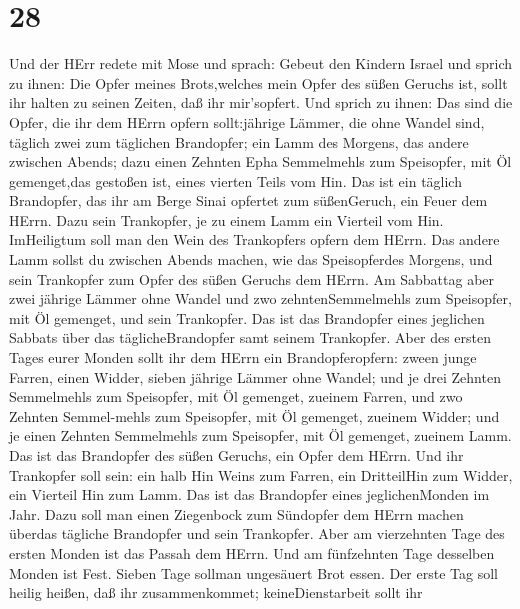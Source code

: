 \hypertarget{section-27}{%
\section{28}\label{section-27}}

 Und der HErr redete mit Mose und sprach: 
Gebeut den Kindern Israel und sprich zu ihnen: Die Opfer meines
Brots,welches mein Opfer des süßen Geruchs ist, sollt ihr halten zu
seinen Zeiten, daß ihr mir'sopfert.  Und sprich zu ihnen:
Das sind die Opfer, die ihr dem HErrn opfern sollt:jährige Lämmer, die
ohne Wandel sind, täglich zwei zum täglichen Brandopfer; 
ein Lamm des Morgens, das andere zwischen Abends;  dazu
einen Zehnten Epha Semmelmehls zum Speisopfer, mit Öl gemenget,das
gestoßen ist, eines vierten Teils vom Hin.  Das ist ein
täglich Brandopfer, das ihr am Berge Sinai opfertet zum süßenGeruch, ein
Feuer dem HErrn.  Dazu sein Trankopfer, je zu einem Lamm ein
Vierteil vom Hin. ImHeiligtum soll man den Wein des Trankopfers opfern
dem HErrn.  Das andere Lamm sollst du zwischen Abends
machen, wie das Speisopferdes Morgens, und sein Trankopfer zum Opfer des
süßen Geruchs dem HErrn.  Am Sabbattag aber zwei jährige
Lämmer ohne Wandel und zwo zehntenSemmelmehls zum Speisopfer, mit Öl
gemenget, und sein Trankopfer.  Das ist das Brandopfer
eines jeglichen Sabbats über das täglicheBrandopfer samt seinem
Trankopfer.  Aber des ersten Tages eurer Monden sollt ihr
dem HErrn ein Brandopferopfern: zween junge Farren, einen Widder, sieben
jährige Lämmer ohne Wandel;  und je drei Zehnten
Semmelmehls zum Speisopfer, mit Öl gemenget, zueinem Farren, und zwo
Zehnten Semmel-mehls zum Speisopfer, mit Öl gemenget, zueinem Widder;
 und je einen Zehnten Semmelmehls zum Speisopfer, mit Öl
gemenget, zueinem Lamm. Das ist das Brandopfer des süßen Geruchs, ein
Opfer dem HErrn.  Und ihr Trankopfer soll sein: ein halb
Hin Weins zum Farren, ein DritteilHin zum Widder, ein Vierteil Hin zum
Lamm. Das ist das Brandopfer eines jeglichenMonden im Jahr.
 Dazu soll man einen Ziegenbock zum Sündopfer dem HErrn
machen überdas tägliche Brandopfer und sein Trankopfer. 
Aber am vierzehnten Tage des ersten Monden ist das Passah dem HErrn.
 Und am fünfzehnten Tage desselben Monden ist Fest. Sieben
Tage sollman ungesäuert Brot essen.  Der erste Tag soll
heilig heißen, daß ihr zusammenkommet; keineDienstarbeit sollt ihr

